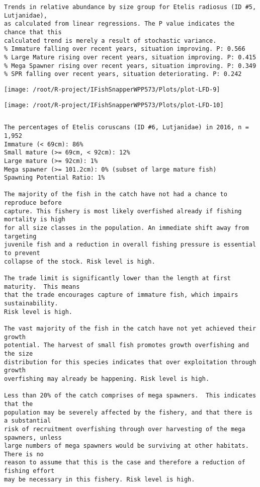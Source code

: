 \documentclass{report}\usepackage[]{graphicx}\usepackage[]{color}
\makeatletter
\def\maxwidth{ %
  \ifdim\Gin@nat@width>\linewidth
    \linewidth
  \else
    \Gin@nat@width
  \fi
}
\newenvironment{kframe}{%
 \def\at@end@of@kframe{}%
 \ifinner\ifhmode%
  \def\at@end@of@kframe{\end{minipage}}%
  \begin{minipage}{\columnwidth}%
 \fi\fi%
 \def\FrameCommand##1{\hskip\@totalleftmargin \hskip-\fboxsep
 \colorbox{shadecolor}{##1}\hskip-\fboxsep
     \hskip-\linewidth \hskip-\@totalleftmargin \hskip\columnwidth}%
 \MakeFramed {\advance\hsize-\width
   \@totalleftmargin\z@ \linewidth\hsize
   \@setminipage}}%
 {\par\unskip\endMakeFramed%
 \at@end@of@kframe}
\newenvironment{knitrout}{}{} %
\makeatother
\begin{document}
\begin{knitrout}
\begin{kframe}
\begin{verbatim}
Trends in relative abundance by size group for Etelis radiosus (ID #5, Lutjanidae),
as calculated from linear regressions. The P value indicates the chance that this
calculated trend is merely a result of stochastic variance.
% Immature falling over recent years, situation improving. P: 0.566
% Large Mature rising over recent years, situation improving. P: 0.415
% Mega Spawner rising over recent years, situation improving. P: 0.349
% SPR falling over recent years, situation deteriorating. P: 0.242
\end{verbatim}
\end{kframe}
\texttt{[image: /root/R-project/IFishSnapperWPP573/Plots/plot-LFD-9]} 

\texttt{[image: /root/R-project/IFishSnapperWPP573/Plots/plot-LFD-10]} 
\begin{kframe}\begin{verbatim}
\end{verbatim}
\end{kframe}
\clearpage
\newpage
\begin{kframe}\begin{verbatim}The percentages of Etelis coruscans (ID #6, Lutjanidae) in 2016, n = 1,952
Immature (< 69cm): 86%
Small mature (>= 69cm, < 92cm): 12%
Large mature (>= 92cm): 1%
Mega spawner (>= 101.2cm): 0% (subset of large mature fish)
Spawning Potential Ratio: 1%
 
The majority of the fish in the catch have not had a chance to reproduce before
capture. This fishery is most likely overfished already if fishing mortality is high
for all size classes in the population. An immediate shift away from targeting
juvenile fish and a reduction in overall fishing pressure is essential to prevent
collapse of the stock. Risk level is high.

The trade limit is significantly lower than the length at first maturity.  This means
that the trade encourages capture of immature fish, which impairs sustainability.
Risk level is high.

The vast majority of the fish in the catch have not yet achieved their growth
potential. The harvest of small fish promotes growth overfishing and the size
distribution for this species indicates that over exploitation through growth
overfishing may already be happening. Risk level is high.

Less than 20% of the catch comprises of mega spawners.  This indicates that the
population may be severely affected by the fishery, and that there is a substantial
risk of recruitment overfishing through over harvesting of the mega spawners, unless
large numbers of mega spawners would be surviving at other habitats. There is no
reason to assume that this is the case and therefore a reduction of fishing effort
may be necessary in this fishery. Risk level is high.
 

\end{verbatim}
\end{kframe}
\end{knitrout}
\end{document}
